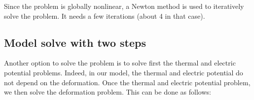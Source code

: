 \documentclass[a4paper,11pt,english]{sphinxmanual}
\begin{document}
\sphinxAtStartPar
Since the problem is globally nonlinear, a Newton method is used to iteratively solve the problem. It needs a few iterations (about 4 in that case).


\subsection{Model solve with two steps}
\label{\detokenize{tutorial/thermo_coupling:model-solve-with-two-steps}}
\sphinxAtStartPar
Another option to solve the problem is to solve first the thermal and electric potential problems. Indeed, in our model, the thermal and  electric potential do not depend on the deformation. Once the  thermal and electric potential problem, we then solve the deformation problem. This can be done as follows:


\begin{savenotes}\sphinxattablestart
\centering
\begin{tabular}[t]{|p{0.080\linewidth}|p{0.900\linewidth}|}
\hline


\end{tabular}
\end{savenotes}
\end{document}
